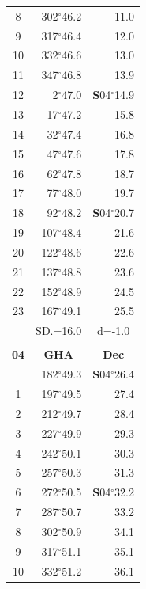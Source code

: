 \documentclass[10pt, a4paper]{report}
\begin{document}
\begin{scriptsize}
\begin{tabular*}{0.2\textwidth}[t]{@{\extracolsep{\fill}}|c|rr|}
8 & 302$^\circ$46.2 & 11.0\\
9 & 317$^\circ$46.4 & \raisebox{0.24ex}{\boldmath$\cdot$~\boldmath$\cdot$~~}12.0\\
10 & 332$^\circ$46.6 & 13.0\\
11 & 347$^\circ$46.8 & 13.9\\[2Pt]
12 & 2$^\circ$47.0 & \textbf{S}04$^\circ$14.9\\
13 & 17$^\circ$47.2 & 15.8\\
14 & 32$^\circ$47.4 & 16.8\\
15 & 47$^\circ$47.6 & \raisebox{0.24ex}{\boldmath$\cdot$~\boldmath$\cdot$~~}17.8\\
16 & 62$^\circ$47.8 & 18.7\\
17 & 77$^\circ$48.0 & 19.7\\[2Pt]
18 & 92$^\circ$48.2 & \textbf{S}04$^\circ$20.7\\
19 & 107$^\circ$48.4 & 21.6\\
20 & 122$^\circ$48.6 & 22.6\\
21 & 137$^\circ$48.8 & \raisebox{0.24ex}{\boldmath$\cdot$~\boldmath$\cdot$~~}23.6\\
22 & 152$^\circ$48.9 & 24.5\\
23 & 167$^\circ$49.1 & 25.5\\
\hline
\rule{0pt}{2.4ex} & \multicolumn{1}{c}{SD.=16.0} & \multicolumn{1}{c|}{d=-1.0}\\
\hline
\multicolumn{1}{c}{}\\[-0.5ex]\hline
\multicolumn{1}{|c|}{\rule{0pt}{2.6ex}\textbf{04}} & \multicolumn{1}{c}{\textbf{GHA}} & \multicolumn{1}{c|}{\textbf{Dec}}\\
\hline\rule{0pt}{2.6ex}\noindent
0 & 182$^\circ$49.3 & \textbf{S}04$^\circ$26.4\\
1 & 197$^\circ$49.5 & 27.4\\
2 & 212$^\circ$49.7 & 28.4\\
3 & 227$^\circ$49.9 & \raisebox{0.24ex}{\boldmath$\cdot$~\boldmath$\cdot$~~}29.3\\
4 & 242$^\circ$50.1 & 30.3\\
5 & 257$^\circ$50.3 & 31.3\\[2Pt]
6 & 272$^\circ$50.5 & \textbf{S}04$^\circ$32.2\\
7 & 287$^\circ$50.7 & 33.2\\
8 & 302$^\circ$50.9 & 34.1\\
9 & 317$^\circ$51.1 & \raisebox{0.24ex}{\boldmath$\cdot$~\boldmath$\cdot$~~}35.1\\
10 & 332$^\circ$51.2 & 36.1\\

\end{tabular*}
\end{scriptsize}
\end{document}
